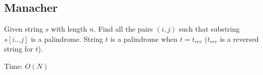 \subsection{Manacher}

Given string $s$ with length $n$. Find all the pairs $(i, j)$ such that substring $s[i\dots j]$ is a palindrome. String $t$ is a palindrome when $t = t_{rev}$ ($t_{rev}$ is a reversed string for $t$).

Time: $O(N)$

